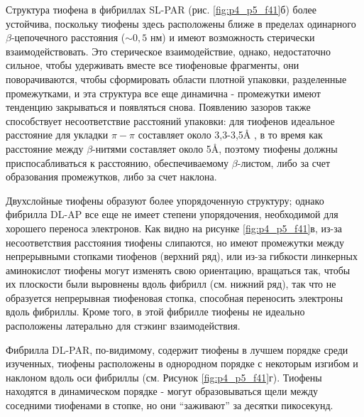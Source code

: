     Структура тиофена в фибриллах SL-PAR (рис. \ref{fig:p4_p5_f41}б) более устойчива, поскольку тиофены здесь расположены ближе в пределах одинарного $\beta$-цепочечного расстояния ($\sim 0,5$ нм) и имеют возможность стерически взаимодействовать. Это стерическое взаимодействие, однако, недостаточно сильное, чтобы удерживать вместе все тиофеновые фрагменты, они поворачиваются, чтобы сформировать области плотной упаковки, разделенные промежутками, и эта структура все еще динамична - промежутки имеют тенденцию закрываться и появляться снова. Появлению зазоров также способствует несоответствие расстояний упаковки: для тиофенов идеальное расстояние для укладки $\pi - \pi$ составляет около 3,3-3,5\AA{} \cite{rodriguez-ropero_ab_2008,tsuzuki_model_2002}, в то время как расстояние между $\beta$-нитями составляет около 5\AA, поэтому тиофены должны приспосабливаться к расстоянию, обеспечиваемому $\beta$-листом, либо за счет образования промежутков, либо за счет наклона.

    Двухслойные тиофены образуют более упорядоченную структуру; однако фибрилла DL-AP все еще не имеет степени упорядочения, необходимой для хорошего переноса электронов. Как видно на рисунке \ref{fig:p4_p5_f41}в, из-за несоответствия расстояния тиофены слипаются, но имеют промежутки между непрерывными стопками тиофенов (верхний ряд), или из-за гибкости линкерных аминокислот тиофены могут изменять свою ориентацию, вращаться так, чтобы их плоскости были выровнены вдоль фибрилл (см. нижний ряд), так что не образуется непрерывная тиофеновая стопка, способная переносить электроны вдоль фибриллы. Кроме того, в этой фибрилле тиофены не идеально расположены латерально для стэкинг взаимодействия.

    Фибрилла DL-PAR, по-видимому, содержит тиофены в лучшем порядке среди изученных, тиофены расположены в однородном порядке с некоторым изгибом и наклоном вдоль оси фибриллы (см. Рисунок \ref{fig:p4_p5_f41}г). Тиофены находятся в динамическом порядке - могут образовываться щели между соседними тиофенами в стопке, но они ``заживают'' за десятки пикосекунд.


